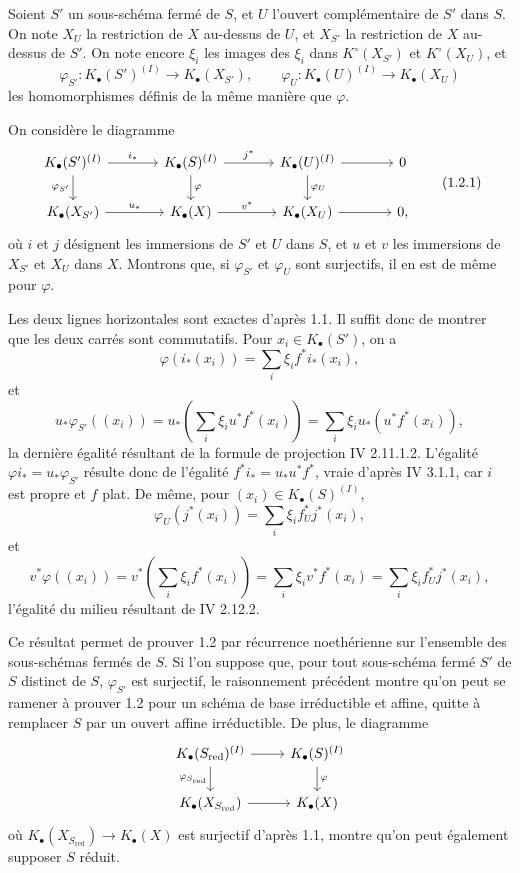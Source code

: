 \documentclass[11pt]{article}
\begin{document}
Soient $S'$ un sous-schéma fermé de $S$, et $U$ l'ouvert complémentaire de $S'$ dans $S$. On note $X_U$ la restriction de $X$ au-dessus de $U$, et $X_{S'}$ la restriction de $X$ au-dessus de $S'$. On note encore $\xi_i$ les images des $\xi_i$ dans $K^\circ(X_{S'})$ et $K^\circ(X_U)$, et
\[
\varphi_{S'}:K_\bullet(S')^{(I)}\to K_\bullet(X_{S'}),\qquad
\varphi_U:K_\bullet(U)^{(I)}\to K_\bullet(X_U)
\]
les homomorphismes définis de la même manière que $\varphi$.

On considère le diagramme
\[
\begin{tikzcd}[column sep=large]
K_\bullet(S')^{(I)} \arrow[r,"i_*"] \arrow[d,"\varphi_{S'}"'] & K_\bullet(S)^{(I)} \arrow[r,"j^*"] \arrow[d,"\varphi"] & K_\bullet(U)^{(I)} \arrow[r] \arrow[d,"\varphi_U"] & 0\\
K_\bullet(X_{S'}) \arrow[r,"u_*"] & K_\bullet(X) \arrow[r,"v^*"] & K_\bullet(X_U) \arrow[r] & 0,
\end{tikzcd}\tag{1.2.1}
\]
où $i$ et $j$ désignent les immersions de $S'$ et $U$ dans $S$, et $u$ et $v$ les immersions de $X_{S'}$ et $X_U$ dans $X$. Montrons que, si $\varphi_{S'}$ et $\varphi_U$ sont surjectifs, il en est de même pour $\varphi$.

Les deux lignes horizontales sont exactes d'après 1.1. Il suffit donc de montrer que les deux carrés sont commutatifs. Pour $x_i\in K_\bullet(S')$, on a
\[
\varphi(i_*(x_i))=\sum_i \xi_i f^*i_*(x_i),
\]
et
\[
u_*\varphi_{S'}((x_i))=u_*\left(\sum_i\xi_i u^*f^*(x_i)\right)
=\sum_i\xi_i u_*(u^*f^*(x_i)),
\]
la dernière égalité résultant de la formule de projection IV 2.11.1.2. L'égalité $\varphi i_*=u_*\varphi_{S'}$ résulte donc de l'égalité $f^*i_*=u_*u^*f^*$, vraie d'après IV 3.1.1, car $i$ est propre et $f$ plat. De même, pour $(x_i)\in K_\bullet(S)^{(I)}$,
\[
\varphi_U(j^*(x_i))=\sum_i\xi_i f_U^*j^*(x_i),
\]
et
\[
v^*\varphi((x_i))=v^*\left(\sum_i\xi_i f^*(x_i)\right)=\sum_i\xi_i v^*f^*(x_i)=\sum_i\xi_i f_U^*j^*(x_i),
\]
l'égalité du milieu résultant de IV 2.12.2.

Ce résultat permet de prouver 1.2 par récurrence noethérienne sur l'ensemble des sous-schémas fermés de $S$. Si l'on suppose que, pour tout sous-schéma fermé $S'$ de $S$ distinct de $S$, $\varphi_{S'}$ est surjectif, le raisonnement précédent montre qu'on peut se ramener à prouver 1.2 pour un schéma de base irréductible et affine, quitte à remplacer $S$ par un ouvert affine irréductible. De plus, le diagramme
\[
\begin{tikzcd}
K_\bullet(S_{\mathrm{red}})^{(I)} \arrow[r] \arrow[d,"\varphi_{S_{\mathrm{red}}}"'] & K_\bullet(S)^{(I)} \arrow[d,"\varphi"]\\
K_\bullet(X_{S_{\mathrm{red}}}) \arrow[r] & K_\bullet(X)
\end{tikzcd}
\]
où $K_\bullet(X_{S_{\mathrm{red}}})\to K_\bullet(X)$ est surjectif d'après 1.1, montre qu'on peut également supposer $S$ réduit.
\end{document}
